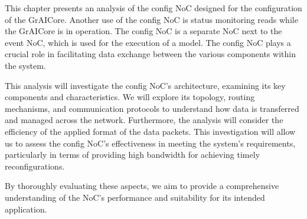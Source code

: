 This chapter presents an analysis of the config NoC designed for the configuration of the GrAICore.
Another use of the config NoC is status monitoring reads while the GrAICore is in operation.
The config NoC is a separate NoC next to the event NoC, which is used for the execution of a model.
The config NoC plays a crucial role in facilitating data exchange between the various components within the system.

This analysis will investigate the config NoC's architecture, examining its key components and characteristics.
We will explore its topology, routing mechanisms, and communication protocols to understand how data is transferred and managed across the network.
Furthermore, the analysis will consider the efficiency of the applied format of the data packets.  
This investigation will allow us to assess the config NoC's effectiveness in meeting the system's requirements, particularly in terms of providing high bandwidth for achieving timely reconfigurations.

By thoroughly evaluating these aspects, we aim to provide a comprehensive understanding of the NoC's performance and suitability for its intended application.

